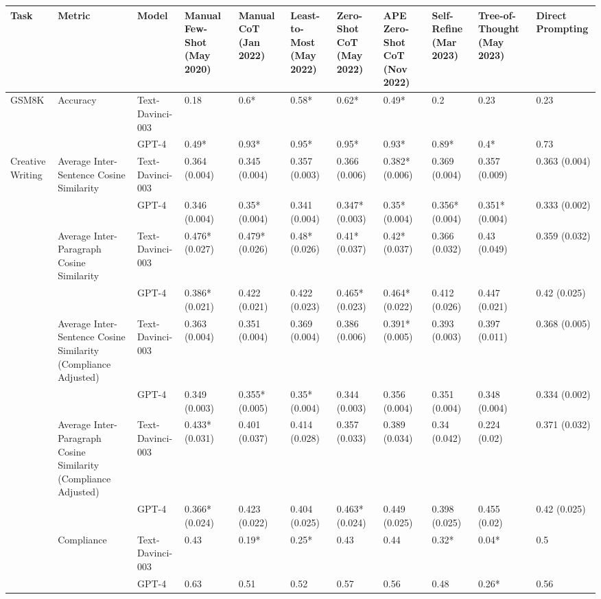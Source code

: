 \begin{tabular}{x{0.75cm}|x{1.5cm}|x{0.75cm}|x{0.75cm}|x{0.75cm}|x{0.75cm}|x{0.75cm}|x{0.75cm}|x{0.75cm}|x{0.75cm}|x{0.75cm}}
\toprule
\hline
Task & Metric & Model & Manual Few-Shot (May 2020) & Manual CoT (Jan 2022) & Least-to-Most (May 2022) & Zero-Shot CoT (May 2022) & APE Zero-Shot CoT (Nov 2022) & Self-Refine (Mar 2023) & Tree-of-Thought (May 2023) & Direct Prompting \\
\hline
\midrule
GSM8K & Accuracy & Text-Davinci-003 & 0.18 & 0.6* & 0.58* & 0.62* & 0.49* & 0.2 & 0.23 & 0.23 \\
\hline
 &  & GPT-4 & 0.49* & 0.93* & 0.95* & 0.95* & 0.93* & 0.89* & 0.4* & 0.73 \\
\hline
Creative Writing & Average Inter-Sentence Cosine Similarity & Text-Davinci-003 & 0.364 (0.004) & 0.345 (0.004) & 0.357 (0.003) & 0.366 (0.006) & 0.382* (0.006) & 0.369 (0.004) & 0.357 (0.009) & 0.363 (0.004) \\
\hline
 &  & GPT-4 & 0.346 (0.004) & 0.35* (0.004) & 0.341 (0.004) & 0.347* (0.003) & 0.35* (0.004) & 0.356* (0.004) & 0.351* (0.004) & 0.333 (0.002) \\
\hline
 & Average Inter-Paragraph Cosine Similarity & Text-Davinci-003 & 0.476* (0.027) & 0.479* (0.026) & 0.48* (0.026) & 0.41* (0.037) & 0.42* (0.037) & 0.366 (0.032) & 0.43 (0.049) & 0.359 (0.032) \\
\hline
 &  & GPT-4 & 0.386* (0.021) & 0.422 (0.021) & 0.422 (0.023) & 0.465* (0.023) & 0.464* (0.022) & 0.412 (0.026) & 0.447 (0.021) & 0.42 (0.025) \\
\hline
 & Average Inter-Sentence Cosine Similarity (Compliance Adjusted) & Text-Davinci-003 & 0.363 (0.004) & 0.351 (0.004) & 0.369 (0.004) & 0.386 (0.006) & 0.391* (0.005) & 0.393 (0.003) & 0.397 (0.011) & 0.368 (0.005) \\
\hline
 &  & GPT-4 & 0.349 (0.003) & 0.355* (0.005) & 0.35* (0.004) & 0.344 (0.003) & 0.356 (0.004) & 0.351 (0.004) & 0.348 (0.004) & 0.334 (0.002) \\
\hline
 & Average Inter-Paragraph Cosine Similarity (Compliance Adjusted) & Text-Davinci-003 & 0.433* (0.031) & 0.401 (0.037) & 0.414 (0.028) & 0.357 (0.033) & 0.389 (0.034) & 0.34 (0.042) & 0.224 (0.02) & 0.371 (0.032) \\
\hline
 &  & GPT-4 & 0.366* (0.024) & 0.423 (0.022) & 0.404 (0.025) & 0.463* (0.024) & 0.449 (0.025) & 0.398 (0.025) & 0.455 (0.02) & 0.42 (0.025) \\
\hline
 & Compliance & Text-Davinci-003 & 0.43 & 0.19* & 0.25* & 0.43 & 0.44 & 0.32* & 0.04* & 0.5 \\
\hline
 &  & GPT-4 & 0.63 & 0.51 & 0.52 & 0.57 & 0.56 & 0.48 & 0.26* & 0.56 \\
\hline
\bottomrule
\end{tabular}
